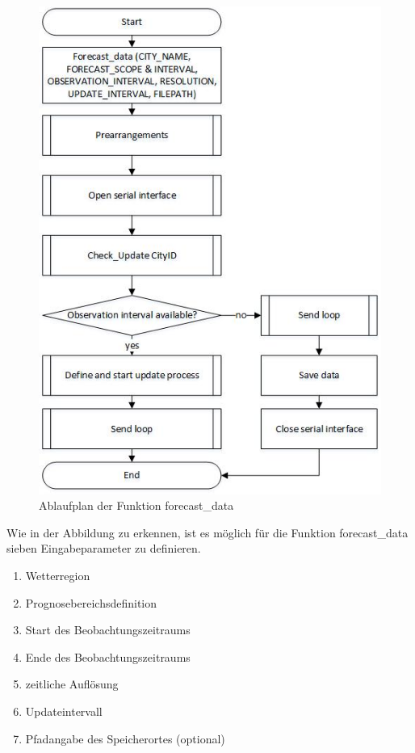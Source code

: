 \begin{figure}
\centering
\includegraphics[scale=1]{programm/flowchart}
\caption{Ablaufplan der Funktion forecast\_data}
\label{fig:flowchart}
\end{figure} 
Wie in der Abbildung zu erkennen, ist es möglich für die Funktion forecast\_data sieben Eingabeparameter zu definieren. 
\begin{enumerate}
\item Wetterregion
\item Prognosebereichsdefinition
\item Start des Beobachtungszeitraums
\item Ende des Beobachtungszeitraums
\item zeitliche Auflösung
\item Updateintervall
\item Pfadangabe des Speicherortes (optional)
\end{enumerate}
